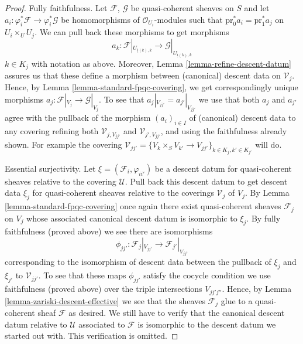 \begin{proof}
\medskip\noindent
Fully faithfulness. Let $\mathcal{F}$, $\mathcal{G}$ be quasi-coherent
sheaves on $S$ and let
$a_i : \varphi_i^*\mathcal{F} \to \varphi_i^*\mathcal{G}$ be
homomorphisms of $\mathcal{O}_{U_i}$-modules such that
$\text{pr}_0^*a_i = \text{pr}_1^*a_j$ on $U_i \times_U U_j$.
We can pull back these morphisms to get morphisms
$$
a_k :
\mathcal{F}|_{U_{\underline{i}(k), k}}
\longrightarrow
\mathcal{G}|_{U_{\underline{i}(k), k}}
$$
$k \in K_j$ with notation as above. Moreover,
Lemma \ref{lemma-refine-descent-datum} assures us
that these define a morphism between (canonical) descent data on
$\mathcal{V}_j$. Hence, by
Lemma \ref{lemma-standard-fpqc-covering}, we get correspondingly
unique morphisms $a_j : \mathcal{F}|_{V_j} \to \mathcal{G}|_{V_j}$.
To see that $a_j|_{V_{jj'}} = a_{j'}|_{V_{jj'}}$ we use that
both $a_j$ and $a_{j'}$ agree with the pullback of the morphism
$(a_i)_{i \in I}$ of (canonical) descent data to any covering
refining both $\mathcal{V}_{j, V_{jj'}}$ and
$\mathcal{V}_{j', V_{jj'}}$, and using the faithfulness already
shown. For example the covering
$\mathcal{V}_{jj'} =
\{V_k \times_S V_{k'} \to V_{jj'}\}_{k \in K_j, k' \in K_{j'}}$
will do.

\medskip\noindent
Essential surjectivity. Let $\xi = (\mathcal{F}_i, \varphi_{ii'})$
be a descent datum for quasi-coherent sheaves relative to the covering
$\mathcal{U}$. Pull back this descent datum to get descent data
$\xi_j$ for quasi-coherent sheaves relative to the coverings
$\mathcal{V}_j$ of $V_j$. By Lemma \ref{lemma-standard-fpqc-covering}
once again there exist
quasi-coherent sheaves $\mathcal{F}_j$ on $V_j$ whose associated
canonical descent datum is isomorphic to $\xi_j$. By fully faithfulness
(proved above) we see there are isomorphisms
$$
\phi_{jj'} :
\mathcal{F}_j|_{V_{jj'}}
\longrightarrow
\mathcal{F}_{j'}|_{V_{jj'}}
$$
corresponding to the isomorphism of descent data between the pullback
of $\xi_j$ and $\xi_{j'}$ to $\mathcal{V}_{jj'}$. To see that these
maps $\phi_{jj'}$ satisfy the cocycle condition we use faithfulness
(proved above) over the triple intersections $V_{jj'j''}$. Hence, by
Lemma \ref{lemma-zariski-descent-effective}
we see that the sheaves $\mathcal{F}_j$
glue to a quasi-coherent sheaf $\mathcal{F}$ as desired.
We still have to verify that the canonical descent datum relative to
$\mathcal{U}$ associated to $\mathcal{F}$ is isomorphic to the descent
datum we started out with. This verification is omitted.
\end{proof}









